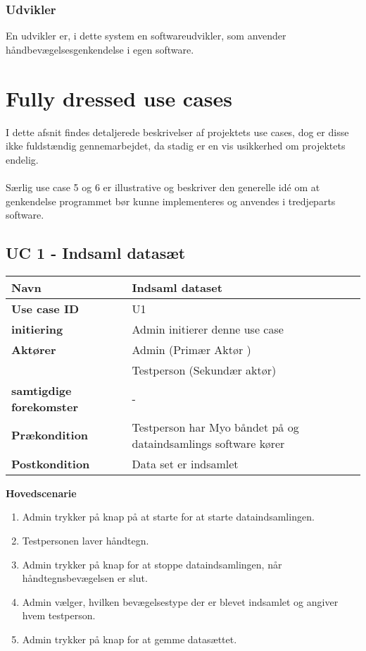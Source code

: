 \subsubsection*{Udvikler}
En udvikler er, i dette system en softwareudvikler, som anvender håndbevægelsesgenkendelse i egen software.  

\section{Fully dressed use cases}
I dette afsnit findes detaljerede beskrivelser af projektets use cases, dog er disse ikke fuldstændig gennemarbejdet, da stadig er en vis usikkerhed om projektets endelig.
\\ \\Særlig use case 5 og 6 er illustrative og beskriver den generelle idé om at genkendelse programmet bør kunne implementeres og anvendes i tredjeparts software.
\subsection{UC 1 - Indsaml datasæt}
\begin{table}[htbp] 
	\begin{tabular}{|p{5cm}|p{9cm}|}
		\hline
		\textbf{Navn} & Indsaml dataset \\ \hline
		\textbf{Use case ID} & U1 \\ \hline
		\textbf{initiering} & Admin initierer denne use case \\ \hline
		\textbf{Aktører} & Admin (Primær Aktør ) \\ & Testperson (Sekundær aktør) \\ \hline
		\textbf{samtigdige forekomster} & - \\ \hline
		\textbf{Prækondition} & Testperson har Myo båndet på og dataindsamlings software kører \\ \hline
		\textbf{Postkondition} & Data set er indsamlet \\ \hline
	\end{tabular}
\end{table}
\textbf{Hovedscenarie}
\begin{enumerate}
	\item Admin trykker på knap på at starte for at starte dataindsamlingen.
	\item Testpersonen laver håndtegn.
	\item Admin trykker på knap for at stoppe dataindsamlingen, når håndtegnsbevægelsen er slut.
	\item Admin vælger, hvilken bevægelsestype der er blevet indsamlet og angiver hvem testperson.
	\item Admin trykker på knap for at gemme datasættet.
\end{enumerate}

